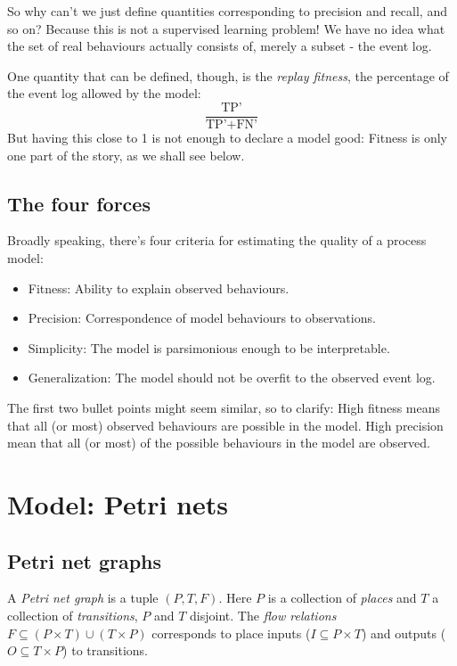 \documentclass[12pt, a4paper]{article}
\numberwithin{equation}{section}
\begin{document}
So why can't we just define quantities corresponding to precision and recall, and so on? Because this is not a supervised learning problem! We have no idea what the set of real behaviours actually consists of, merely a subset - the event log.

One quantity that can be defined, though, is the \textit{replay fitness}, the percentage of the event log allowed by the model:
\begin{equation}
\frac{\textrm{TP'}}{\textrm{TP'}+\textrm{FN'}}
\end{equation}
But having this close to 1 is not enough to declare a model good: Fitness is only one part of the story, as we shall see below.

\subsection{The four forces}
Broadly speaking, there's four criteria for estimating the quality of a process model:
\begin{itemize}
\item Fitness: Ability to explain observed behaviours.
\item Precision: Correspondence of model behaviours to observations.
\item Simplicity: The model is parsimonious enough to be interpretable.
\item Generalization: The model should not be overfit to the observed event log.
\end{itemize}
The first two bullet points might seem similar, so to clarify: High fitness means that all (or most) observed behaviours are possible in the model. High precision mean that all (or most) of the possible behaviours in the model are observed.

\section{Model: Petri nets}

\subsection{Petri net graphs}
A \textit{Petri net graph} is a tuple $(P, T, F)$. Here $P$ is a collection of \textit{places} and $T$ a collection of \textit{transitions}, $P$ and $T$ disjoint. The \textit{flow relations} $F\subseteq(P\times T)\cup(T\times P)$ corresponds to place inputs ($I\subseteq P\times T$) and outputs ($O\subseteq T\times P$) to transitions.
\end{document}

